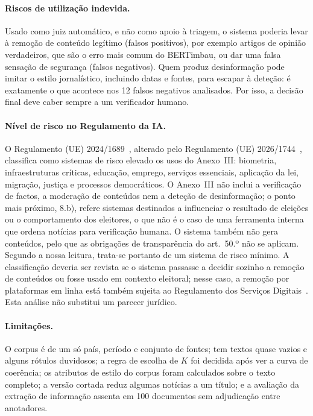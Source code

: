 \paragraph{Riscos de utilização indevida.}
Usado como juiz automático, e não como apoio à triagem, o sistema poderia levar à remoção de conteúdo
legítimo (falsos positivos), por exemplo artigos de opinião verdadeiros, que são o erro mais comum do
BERTimbau, ou dar uma falsa sensação de segurança (falsos negativos). Quem produz desinformação pode
imitar o estilo jornalístico, incluindo datas e fontes, para escapar à deteção: é exatamente o que
acontece nos 12 falsos negativos analisados. Por isso, a decisão final deve caber sempre a um
verificador humano.

\paragraph{Nível de risco no Regulamento da IA.}
O Regulamento (UE) 2024/1689~\cite{aiact2024}, alterado pelo Regulamento (UE)
2026/1744~\cite{omnibus2026}, classifica como sistemas de risco elevado os usos do Anexo~III:
biometria, infraestruturas críticas, educação, emprego, serviços essenciais, aplicação da lei,
migração, justiça e processos democráticos. O Anexo~III não inclui a verificação de factos, a
moderação de conteúdos nem a deteção de desinformação; o ponto mais próximo, 8.b), refere sistemas
destinados a influenciar o resultado de eleições ou o comportamento dos eleitores, o que não é o caso
de uma ferramenta interna que ordena notícias para verificação humana. O sistema também não gera
conteúdos, pelo que as obrigações de transparência do art.~50.º não se aplicam. Segundo a nossa
leitura, trata-se portanto de um sistema de risco mínimo. A classificação deveria ser revista se o
sistema passasse a decidir sozinho a remoção de conteúdos ou fosse usado em contexto eleitoral; nesse
caso, a remoção por plataformas em linha está também sujeita ao Regulamento dos Serviços
Digitais~\cite{dsa2022}. Esta análise não substitui um parecer jurídico.

\paragraph{Limitações.}
O corpus é de um só país, período e conjunto de fontes; tem textos quase vazios e alguns rótulos
duvidosos; a regra de escolha de $K$ foi decidida após ver a curva de coerência; os atributos de
estilo do corpus foram calculados sobre o texto completo; a versão cortada reduz algumas notícias a
um título; e a avaliação da extração de informação assenta em 100 documentos sem adjudicação entre
anotadores.
